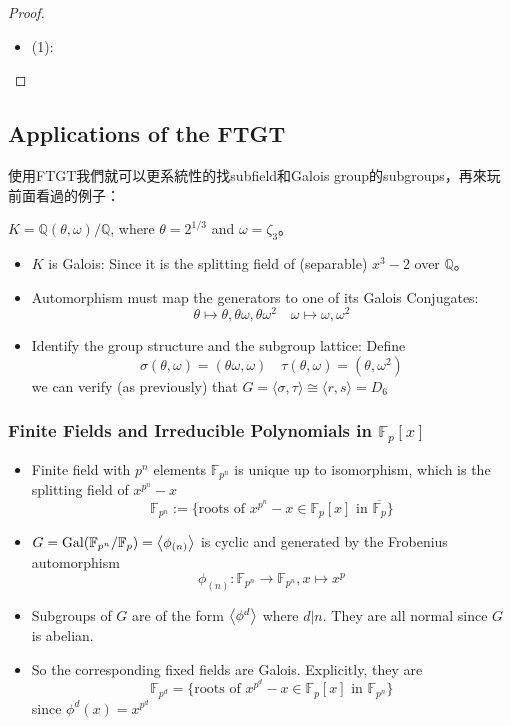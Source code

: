 \documentclass[12pt]{article}
\theoremstyle{definition}
\newcommand{\FF}{\mathbb F}
\newcommand{\QQ}{\mathbb Q}
\DeclareMathOperator{\Gal}{Gal}
\begin{document}
\begin{proof}
	\begin{itemize}
		\item (1):
	\end{itemize}


\end{proof}

\subsection{Applications of the FTGT}
使用FTGT我們就可以更系統性的找subfield和Galois group的subgroups，再來玩前面看過的例子：

\begin{ex}
	$K=\QQ(\theta,\omega)/\QQ$, where $\theta=2^{1/3}$ and $\omega=\zeta_3$。

	\begin{itemize}
		\item $K$ is Galois: Since it is the splitting field of (separable) $x^3-2$ over $\QQ$。
		\item Automorphism must map the generators to one of its Galois Conjugates:
		      \[\theta\mapsto\theta, \theta\omega, \theta\omega^2\quad \omega\mapsto \omega, \omega^2\]

		\item Identify the group structure and the subgroup lattice: Define
		      \[\sigma(\theta,\omega)=(\theta\omega,\omega)\quad\tau(\theta,\omega)=(\theta,\omega^2)\]
		      we can verify (as previously) that $G=\langle \sigma,\tau\rangle\cong \langle r,s\rangle =D_6$
	\end{itemize}
\end{ex}

\clearpage
\subsubsection{Finite Fields and Irreducible Polynomials in $\FF_p[x]$}

\begin{itemize}
	\item Finite field with $p^n$ elements $\FF_{p^n}$ is unique up to isomorphism, which is the splitting field of $x^{p^n}-x$
	      \[
		      \mathbb{F}_{p^n}:= \{ \text{roots of } x^{p^n} - x \in \mathbb{F}_p[x] \text{ in } \overline{\mathbb{F}_p} \}
	      \]
	\item $G=\Gal(\FF_{p^n}/\FF_p)=\expval{\phi_{(n)}}$ is cyclic and generated by the
	      Frobenius automorphism
	      \[\phi_{(n)}:\FF_{p^n}\to\FF_{p^n}, x\mapsto x^p\]
	\item Subgroups of $G$ are of the form $\expval{\phi^d}$ where $d|n$.
	      They are all normal since $G$ is abelian.
	\item So the corresponding fixed fields are Galois. Explicitly, they are
	      \[
		      \FF_{p^d}=\{ \text{roots of } x^{p^d} - x \in \mathbb{F}_p[x] \text{ in } \FF_{p^n} \}
	      \]
	      since $\phi^d(x)=x^{p^d}$
\end{itemize}
\end{document}
